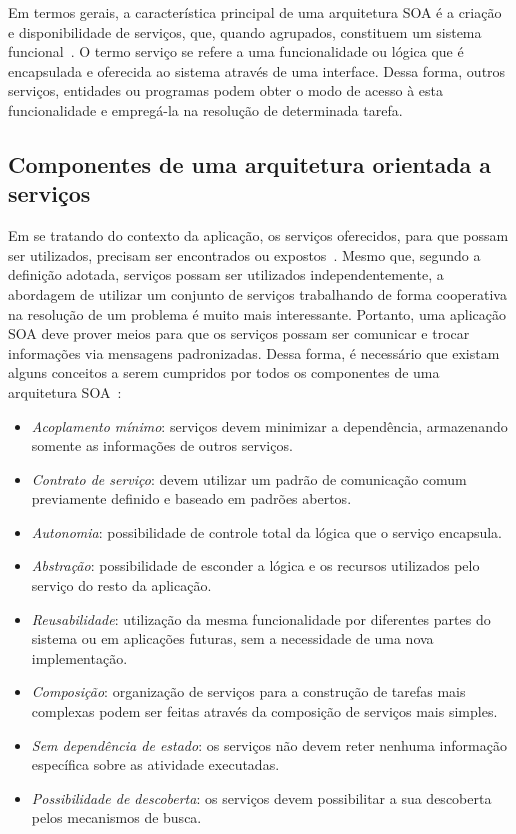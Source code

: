 Em termos gerais, a característica principal de uma arquitetura \gls{SOA} é a criação e
disponibilidade de serviços, que, quando agrupados, constituem um sistema
funcional~\cite{josuttis2009soa}. O termo serviço se refere a uma funcionalidade ou lógica que é
encapsulada e oferecida ao sistema através de uma interface. Dessa forma, outros serviços, entidades
ou programas podem obter o modo de acesso à esta funcionalidade e empregá-la na resolução de
determinada tarefa.


\subsection{Componentes de uma arquitetura orientada a serviços}

Em se tratando do contexto da aplicação, os serviços oferecidos, para que possam ser utilizados,
precisam ser encontrados ou expostos~\cite{papazoglou2007service}. Mesmo que, segundo a definição
adotada, serviços possam ser utilizados independentemente, a abordagem de utilizar um conjunto de
serviços trabalhando de forma cooperativa na resolução de um problema é muito mais interessante.
Portanto, uma aplicação \gls{SOA} deve prover meios para que os serviços possam ser comunicar e
trocar informações via mensagens padronizadas. Dessa forma, é necessário que existam alguns
conceitos a serem cumpridos por todos os componentes de uma arquitetura
\gls{SOA}~\cite{erl2005service}:

\begin{itemize}
  \item \emph{Acoplamento mínimo}: serviços devem minimizar a dependência, armazenando somente as
  informações de outros serviços.

  \item \emph{Contrato de serviço}: devem utilizar um padrão de comunicação comum previamente
  definido e baseado em padrões abertos.

  \item \emph{Autonomia}: possibilidade de controle total da lógica que o serviço encapsula.

  \item \emph{Abstração}: possibilidade de esconder a lógica e os recursos utilizados pelo serviço
  do resto da aplicação.

  \item \emph{Reusabilidade}: utilização da mesma funcionalidade por diferentes partes do sistema ou
  em aplicações futuras, sem a necessidade de uma nova implementação.

  \item \emph{Composição}: organização de serviços para a construção de tarefas mais complexas podem
  ser feitas através da composição de serviços mais simples.

  \item \emph{Sem dependência de estado}: os serviços não devem reter nenhuma informação específica
  sobre as atividade executadas.

  \item \emph{Possibilidade de descoberta}: os serviços devem possibilitar a sua descoberta pelos
  mecanismos de busca.
\end{itemize}

